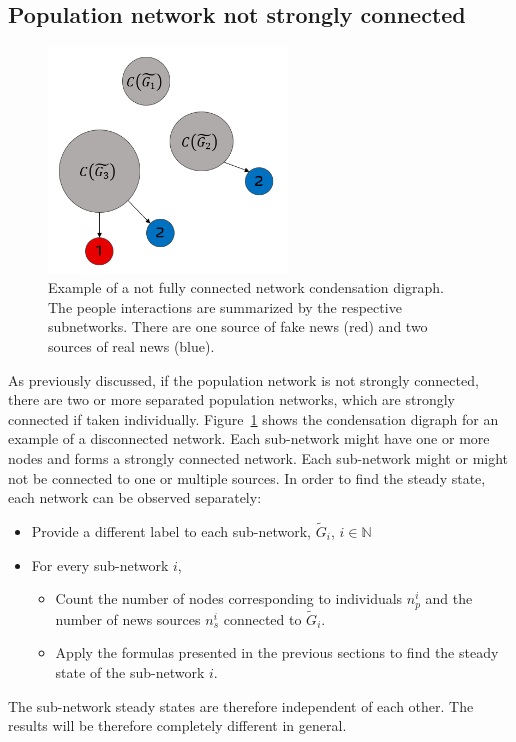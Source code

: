 \subsection{Population network not strongly connected}
\begin{figure}[!t]
	\centering
	\includegraphics[width=2.5in]{Figures/not_strongly_connected.png}
	\caption{Example of a not fully connected network condensation digraph. The people interactions are summarized by the respective subnetworks. There are one source of fake news (red) and two sources of real news (blue).}
	\label{pics:nonconnectednetwork}
\end{figure}
As previously discussed, if the population network is not strongly connected, there are two or more separated population networks, which are strongly connected if taken individually. Figure~\ref{pics:nonconnectednetwork} shows the condensation digraph for an example of a disconnected network. Each sub-network might have one or more nodes and forms a strongly connected network. Each sub-network might or might not be connected to one or multiple sources. \newline
In order to find the steady state, each network can be observed separately:
\begin{itemize}
	\item 
	Provide a different label to each sub-network, $\tilde{G}_i$, $i \in \mathbb{N}$
	\item 
	For every sub-network $i$,
	\begin{itemize}
		\item 
		Count the number of nodes corresponding to individuals $n_p^i$ and the number of news sources $n_s^i$ connected to $\tilde{G}_i$. 
		\item 
		Apply the formulas presented in the previous sections to find the steady state of the sub-network $i$.
	\end{itemize}
\end{itemize}
The sub-network steady states are therefore independent of each other. The results will be therefore completely different in general. 